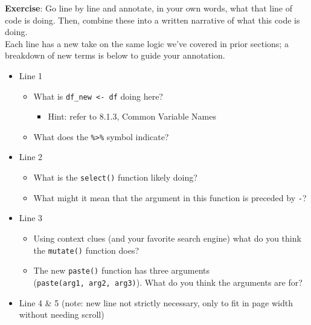 \documentclass[
]{book}
\providecommand{\tightlist}{%
  \setlength{\itemsep}{0pt}\setlength{\parskip}{0pt}}
\begin{document}
\textbf{Exercise}: Go line by line and annotate, in your own words, what that line of code is doing. Then, combine these into a written narrative of what this code is doing.\\

Each line has a new take on the same logic we've covered in prior sections; a breakdown of new terms is below to guide your annotation.

\begin{itemize}
\tightlist
\item
  Line 1

  \begin{itemize}
  \tightlist
  \item
    What is \texttt{df\_new\ \textless{}-\ df} doing here?

    \begin{itemize}
    \tightlist
    \item
      Hint: refer to 8.1.3, Common Variable Names
    \end{itemize}
  \item
    What does the \texttt{\%\textgreater{}\%} symbol indicate?
  \end{itemize}
\item
  Line 2

  \begin{itemize}
  \tightlist
  \item
    What is the \texttt{select()} function likely doing?
  \item
    What might it mean that the argument in this function is preceded by \texttt{-}?
  \end{itemize}
\item
  Line 3

  \begin{itemize}
  \tightlist
  \item
    Using context clues (and your favorite search engine) what do you think the \texttt{mutate()} function does?
  \item
    The new \texttt{paste()} function has three arguments (\texttt{paste(arg1,\ arg2,\ arg3)}). What do you think the arguments are for?
  \end{itemize}
\item
  Line 4 \& 5 (note: new line not strictly necessary, only to fit in page width without needing scroll)


\end{itemize}
\end{document}
